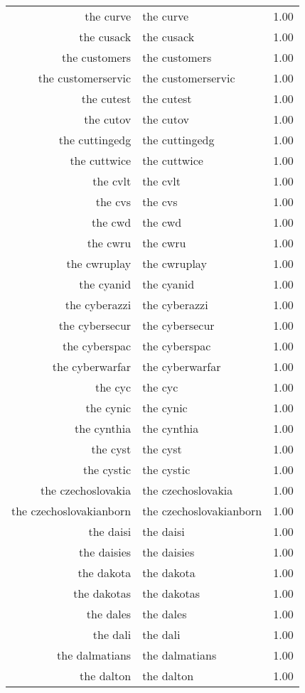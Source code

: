 \begin{table}[ht]
\begin{tabular}{rlr}
  the curve & the curve & 1.00 \\ 
  the cusack & the cusack & 1.00 \\ 
  the customers & the customers & 1.00 \\ 
  the customerservic & the customerservic & 1.00 \\ 
  the cutest & the cutest & 1.00 \\ 
  the cutov & the cutov & 1.00 \\ 
  the cuttingedg & the cuttingedg & 1.00 \\ 
  the cuttwice & the cuttwice & 1.00 \\ 
  the cvlt & the cvlt & 1.00 \\ 
  the cvs & the cvs & 1.00 \\ 
  the cwd & the cwd & 1.00 \\ 
  the cwru & the cwru & 1.00 \\ 
  the cwruplay & the cwruplay & 1.00 \\ 
  the cyanid & the cyanid & 1.00 \\ 
  the cyberazzi & the cyberazzi & 1.00 \\ 
  the cybersecur & the cybersecur & 1.00 \\ 
  the cyberspac & the cyberspac & 1.00 \\ 
  the cyberwarfar & the cyberwarfar & 1.00 \\ 
  the cyc & the cyc & 1.00 \\ 
  the cynic & the cynic & 1.00 \\ 
  the cynthia & the cynthia & 1.00 \\ 
  the cyst & the cyst & 1.00 \\ 
  the cystic & the cystic & 1.00 \\ 
  the czechoslovakia & the czechoslovakia & 1.00 \\ 
  the czechoslovakianborn & the czechoslovakianborn & 1.00 \\ 
  the daisi & the daisi & 1.00 \\ 
  the daisies & the daisies & 1.00 \\ 
  the dakota & the dakota & 1.00 \\ 
  the dakotas & the dakotas & 1.00 \\ 
  the dales & the dales & 1.00 \\ 
  the dali & the dali & 1.00 \\ 
  the dalmatians & the dalmatians & 1.00 \\ 
  the dalton & the dalton & 1.00 \\ 

\end{tabular}
\end{table}
